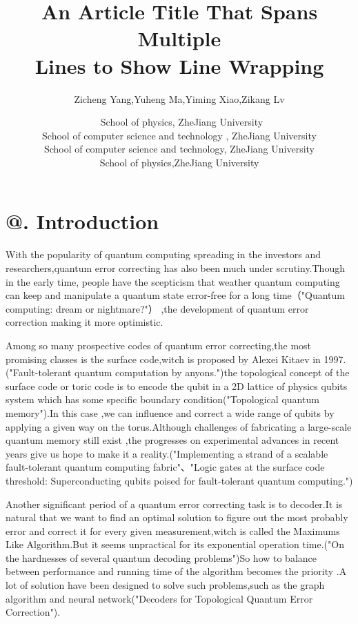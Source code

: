\documentclass[
	a4paper, %
	10pt, %
	unnumberedsections, %
	twoside, %
]{LTJournalArticle}
\title{An Article Title That Spans Multiple\\ Lines to Show Line Wrapping} %
\author{
	Zicheng Yang,Yuheng Ma,Yiming Xiao,Zikang Lv
}
\date{\footnotesize\ School of physics, ZheJiang University \\ School of computer science and technology , ZheJiang University \\  School of computer science and technology, ZheJiang University \\  School of physics,ZheJiang University}
\makeatletter
\newcommand{\Rmnum}[1]{\expandafter\@slowromancap\romannumeral #1@}
\makeatother
\begin{document}
\maketitle %


\section{\Rmnum{1}. Introduction}
With the popularity of quantum computing spreading in the investors and researchers,quantum error correcting has also been much under scrutiny.Though in the early time, people  have the scepticism that weather quantum computing can keep and manipulate a quantum state error-free for a long time（"Quantum computing: dream or nightmare?"） ,the development of quantum error correction making it more optimistic.

Among so many prospective codes of quantum error correcting,the most promising classes is the surface code,witch is proposed by Alexei Kitaev in 1997.("Fault-tolerant quantum computation by anyons.")the topological concept of the surface code or toric code is to encode the qubit in a 2D lattice of physics qubits system which has some specific boundary condition("Topological quantum memory").In this case ,we can influence and correct a wide range of qubits by applying a given way on the torus.Although challenges of fabricating a large-scale quantum memory still exist ,the progresses on experimental advances in recent years give us hope to make it a reality.("Implementing a strand of a scalable fault-tolerant quantum computing fabric"、"Logic gates at the surface code threshold: Superconducting qubits poised for fault-tolerant quantum computing.")

Another significant period of a quantum error correcting task is to decoder.It is natural that we want to find an optimal solution to figure out the most probably error and correct it for every given measurement,witch is called the Maximums Like Algorithm.But it seems unpractical for its exponential operation time.("On the hardnesses of several quantum decoding problems")So how to balance between performance and running time of the algorithm becomes the priority .A lot of solution have been designed to solve such problems,such as the graph algorithm and neural network("Decoders for Topological Quantum Error Correction").
\end{document}
